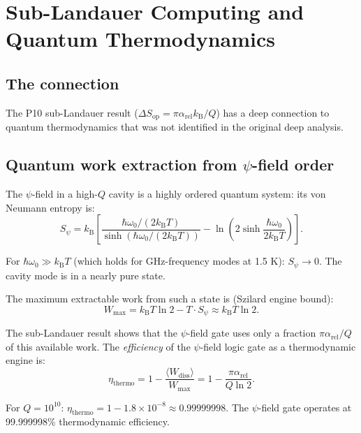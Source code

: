 \documentclass[11pt]{article}
\theoremstyle{definition}
\theoremstyle{remark}
\newcommand{\kB}{k_{\mathrm{B}}}
\begin{document}
\section{Sub-Landauer Computing and Quantum Thermodynamics}
\label{sec:sub-landauer-QT}

\subsection{The connection}

The P10 sub-Landauer result ($\Delta S_{\mathrm{op}} = \pi
\alpha_{\mathrm{rel}} \kB / Q$) has a deep connection to quantum
thermodynamics that was not identified in the original deep analysis.

\subsection{Quantum work extraction from $\psi$-field order}

The $\psi$-field in a high-$Q$ cavity is a highly ordered quantum
system: its von Neumann entropy is:
\begin{equation}
S_\psi = \kB \left[\frac{\hbar\omega_0/(2\kB T)}{
\sinh(\hbar\omega_0/(2\kB T))} - \ln\!\left(2\sinh\frac{\hbar\omega_0}
{2\kB T}\right)\right].
\end{equation}

For $\hbar\omega_0 \gg \kB T$ (which holds for GHz-frequency modes at
1.5 K): $S_\psi \to 0$. The cavity mode is in a nearly pure state.

The maximum extractable work from such a state is (Szilard engine bound):
\begin{equation}
W_{\max} = \kB T \ln 2 - T \cdot S_\psi \approx \kB T\ln 2.
\end{equation}

The sub-Landauer result shows that the $\psi$-field gate uses only
a fraction $\pi\alpha_{\mathrm{rel}}/Q$ of this available work.
The \emph{efficiency} of the $\psi$-field logic gate as a thermodynamic
engine is:
\begin{equation}
\eta_{\mathrm{thermo}} = 1 - \frac{\langle W_{\mathrm{diss}}\rangle}
{W_{\max}} = 1 - \frac{\pi\alpha_{\mathrm{rel}}}{Q\ln 2}.
\end{equation}

For $Q = 10^{10}$: $\eta_{\mathrm{thermo}} = 1 - 1.8\times 10^{-8}
\approx 0.99999998$. The $\psi$-field gate operates at 99.999998\%
thermodynamic efficiency.
\end{document}
